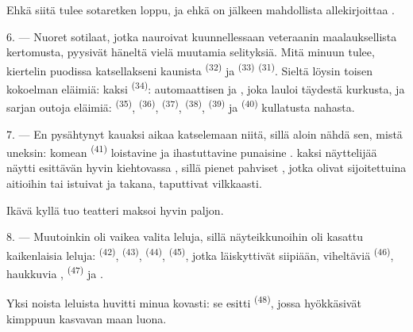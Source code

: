 Ehkä siitä tulee sotaretken loppu, ja ehkä on  jälkeen
mahdollista allekirjoittaa .

\VUsaut{4.4mm}
\VUsaut{2.8mm}

6. --- Nuoret sotilaat, jotka nauroivat kuunnellessaan veteraanin
maalauksellista kertomusta, pyysivät häneltä vielä muutamia selityksiä. Mitä
minuun tulee, kiertelin puodissa katsellakseni kaunista 
\textsuperscript{(32)} ja  \textsuperscript{(33)}
 \textsuperscript{(31)}. Sieltä löysin toisen kokoelman
eläimiä: kaksi  \textsuperscript{(34)}: automaattisen
 ja , joka lauloi täydestä kurkusta, ja
sarjan outoja eläimiä:  \textsuperscript{(35)},
 \textsuperscript{(36)}, 
\textsuperscript{(37)},  \textsuperscript{(38)},
 \textsuperscript{(39)} ja 
\textsuperscript{(40)} kullatusta nahasta.

7. --- En pysähtynyt kauaksi aikaa katselemaan niitä, sillä aloin nähdä sen,
mistä uneksin: komean  \textsuperscript{(41)} loistavine
 ja ihastuttavine punaisine .
 kaksi näyttelijää näytti esittävän  hyvin
kiehtovassa , sillä pienet pahviset ,
jotka olivat sijoitettuina aitioihin tai istuivat  ja
  takana, taputtivat vilkkaasti.

Ikävä kyllä tuo teatteri maksoi hyvin paljon.

8. --- Muutoinkin oli vaikea valita leluja, sillä näyteikkunoihin oli kasattu
kaikenlaisia leluja:  \textsuperscript{(42)},
 \textsuperscript{(43)}, 
\textsuperscript{(44)},  \textsuperscript{(45)}, jotka
läiskyttivät siipiään, viheltäviä 
\textsuperscript{(46)}, haukkuvia , 
\textsuperscript{(47)} ja .


Yksi noista leluista huvitti minua kovasti: se esitti 
\textsuperscript{(48)}, jossa  hyökkäsivät 
kimppuun  kasvavan maan luona.

